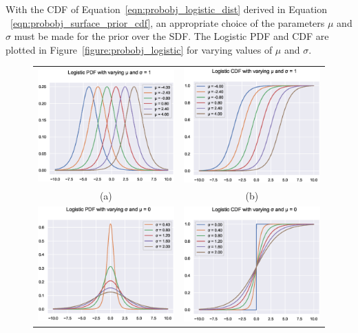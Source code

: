 With the CDF of Equation~\ref{eqn:probobj_logistic_dist} derived in Equation
~\ref{eqn:probobj_surface_prior_cdf}, an appropriate choice of the parameters \( \mu \)
and \( \sigma \) must be made for the prior over the SDF\@. The Logistic PDF and CDF are 
plotted in Figure~\ref{figure:probobj_logistic} for varying values of \( \mu \) and \( \sigma \).
\begin{figure}[!htbp]
	\centering
	\begin{tabular}{cc}
		\includegraphics[width=.45\linewidth]{figures/object_recon/logistic/mu_pdf.eps}&
    \includegraphics[width=.45\linewidth]{figures/object_recon/logistic/mu_cdf.eps} \\
    (a) & (b) \\
		\includegraphics[width=.45\linewidth]{figures/object_recon/logistic/sigma_pdf.eps}&
    \includegraphics[width=.45\linewidth]{figures/object_recon/logistic/sigma_cdf.eps} \\

\end{tabular}
\end{figure}
